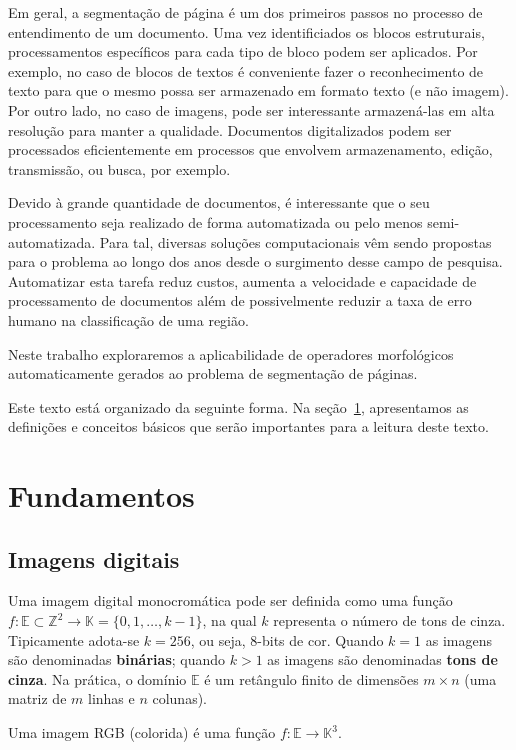 \documentclass[a4paper,11pt]{article}
\begin{document}
Em geral, a segmentação de página é um dos primeiros passos no
processo de entendimento de um documento. Uma vez identificiados os
blocos estruturais, processamentos específicos para cada tipo de bloco
podem ser aplicados. Por exemplo, no caso de blocos de textos é
conveniente fazer o reconhecimento de texto para que o mesmo possa ser
armazenado em formato texto (e não imagem). Por outro lado, no caso de
imagens, pode ser interessante armazená-las em alta resolução para
manter a qualidade. Documentos digitalizados podem ser processados
eficientemente em processos que envolvem armazenamento, edição,
transmissão, ou busca, por exemplo.

Devido à grande quantidade de documentos, é interessante que o seu
processamento seja realizado de forma automatizada ou pelo menos
semi-automatizada. Para tal, diversas soluções computacionais vêm
sendo propostas para o problema ao longo dos anos desde o surgimento
desse campo de pesquisa. Automatizar esta tarefa reduz custos, aumenta
a velocidade e capacidade de processamento de documentos além de
possivelmente reduzir a taxa de erro humano na classificação de uma
região.

Neste trabalho exploraremos a aplicabilidade de operadores
morfológicos automaticamente gerados ao problema de segmentação de
páginas.

Este texto está organizado da seguinte forma. Na seção~\ref{sec:fundamentos},
apresentamos as definições e conceitos básicos que serão importantes
para a leitura deste texto.

\section{Fundamentos}
\label{sec:fundamentos}

\subsection{Imagens digitais}
  Uma imagem digital monocromática pode ser definida como uma função $f:
  \mathbb{E} \subset \mathbb{Z}^2 \to \mathbb{K} = \{0,1,\ldots,k-1\}$, na qual $k$ representa o número de tons de cinza. Tipicamente adota-se $k=256$, ou seja, 8-bits de cor. Quando $k=1$ as imagens são denominadas {\bf binárias}; quando $k>1$ as imagens são denominadas {\bf tons de cinza}. Na prática, o domínio $\mathbb{E}$ é um retângulo finito de dimensões $m\times n$ (uma matriz de $m$ linhas e $n$ colunas).

  Uma imagem RGB (colorida) é uma função $f: \mathbb{E} \to \mathbb{K}^3$.
\end{document}
